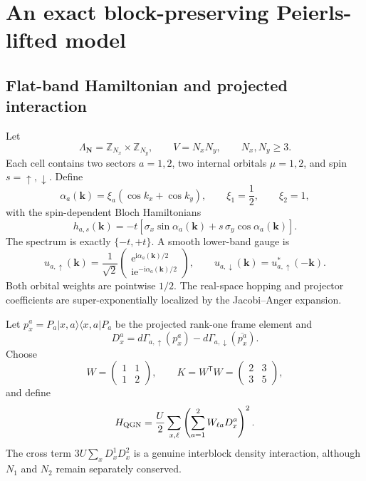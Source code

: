 \documentclass[11pt]{article}
\theoremstyle{remark}
\newcommand{\ket}[1]{\lvert #1\rangle}
\newcommand{\bra}[1]{\langle #1\rvert}
\newcommand{\I}{\mathrm i}
\newcommand{\e}{\mathrm e}
\newcommand{\bmk}{\bm k}
\begin{document}
\section{An exact block-preserving Peierls-lifted model}
\label{sec:base-model}

\subsection{Flat-band Hamiltonian and projected interaction}

Let
\begin{equation}
\Lambda_{\bm N}=\mathbb Z_{N_x}\times\mathbb Z_{N_y},
\qquad V=N_xN_y,
\qquad N_x,N_y\ge3.
\end{equation}
Each cell contains two sectors $a=1,2$, two internal orbitals $\mu=1,2$, and spin $s=\uparrow,\downarrow$.  Define
\begin{equation}
\alpha_a(\bmk)=\xi_a(\cos k_x+\cos k_y),
\qquad \xi_1=\frac12,
\qquad \xi_2=1,
\end{equation}
with the spin-dependent Bloch Hamiltonians
\begin{equation}
h_{a,s}(\bmk)
=-t\left[\sigma_x\sin\alpha_a(\bmk)
+s\,\sigma_y\cos\alpha_a(\bmk)\right].
\label{eq:modelII-bloch}
\end{equation}
The spectrum is exactly $\{-t,+t\}$.  A smooth lower-band gauge is
\begin{equation}
u_{a,\uparrow}(\bmk)=\frac1{\sqrt2}
\begin{pmatrix}
\e^{\I\alpha_a(\bmk)/2}\\
\I\e^{-\I\alpha_a(\bmk)/2}
\end{pmatrix},
\qquad
u_{a,\downarrow}(\bmk)=u_{a,\uparrow}^*(-\bmk).
\label{eq:modelII-spinor}
\end{equation}
Both orbital weights are pointwise $1/2$.  The real-space hopping and projector coefficients are super-exponentially localized by the Jacobi--Anger expansion.

Let $p_x^a=P_a\ket{x,a}\!\bra{x,a}P_a$ be the projected rank-one frame element and
\begin{equation}
D_x^a=d\Gamma_{a,\uparrow}(p_x^a)
-d\Gamma_{a,\downarrow}(\overline{p_x^a}).
\end{equation}
Choose
\begin{equation}
W=\begin{pmatrix}1&1\\1&2\end{pmatrix},
\qquad
K=W^{\mathsf T}W=
\begin{pmatrix}2&3\\3&5\end{pmatrix},
\end{equation}
and define
\begin{equation}
H_{\rm QGN}=\frac U2\sum_{x,\ell}
\left(\sum_{a=1}^2W_{\ell a}D_x^a\right)^2.
\label{eq:base-QGN}
\end{equation}
The cross term $3U\sum_xD_x^1D_x^2$ is a genuine interblock density interaction, although $N_1$ and $N_2$ remain separately conserved.
\end{document}
